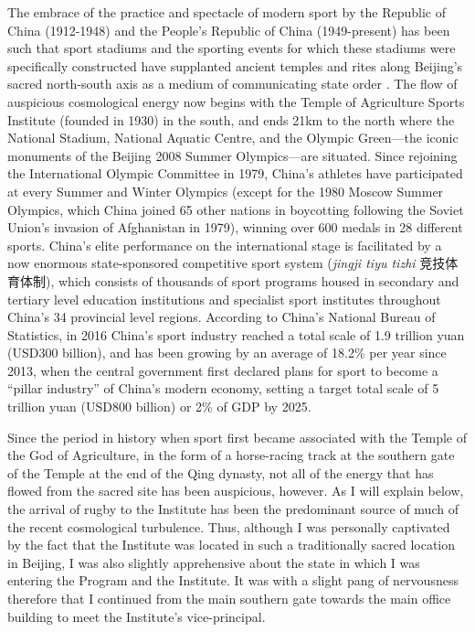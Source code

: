 The embrace of the practice and spectacle of modern sport by the Republic of China (1912-1948) and the People's Republic of China (1949-present) has been such that
sport stadiums and the sporting events for which these stadiums were specifically constructed have supplanted ancient temples and rites along Beijing's sacred north-south axis as a medium of communicating state order \citep{Brownell1995}.  The flow of auspicious cosmological energy now begins with the Temple of Agriculture Sports Institute (founded in 1930) in the south, and ends 21km to the north where the National Stadium, National Aquatic Centre, and the Olympic Green---the iconic monuments of the Beijing 2008 Summer Olympics---are situated.  Since rejoining the International Olympic Committee in 1979, China's athletes have participated at every Summer and Winter Olympics (except for the 1980 Moscow Summer Olympics, which China joined 65 other nations in boycotting following the Soviet Union's invasion of Afghanistan in 1979), winning over 600 medals in 28 different sports.  China's elite performance on the international stage is facilitated by a now enormous state-sponsored competitive sport system (\textit{jingji tiyu tizhi} 竞技体育体制), which consists of thousands of sport programs housed in secondary and tertiary level education institutions and specialist sport institutes throughout China's 34 provincial level regions.  According to China's National Bureau of Statistics, in 2016 China's sport industry reached a total scale of 1.9 trillion yuan (USD300 billion), and has been growing by an average of 18.2\% per year since 2013, when the central government first declared plans for sport to become a ``pillar industry'' of China's modern economy, setting a target total scale of 5 trillion yuan (USD800 billion) or 2\% of GDP by 2025.

Since the period in history when sport first became associated with the Temple of the God of Agriculture, in the form of a horse-racing track at the southern gate of the Temple at the end of the Qing dynasty, not all of the energy that has flowed from the sacred site has been auspicious, however.  As I will explain below, the arrival of rugby to the Institute has been the predominant source of much of the recent cosmological turbulence.  Thus, although I was personally captivated by the fact that the Institute was located in such a traditionally sacred location in Beijing, I was also slightly apprehensive about the state in which I was entering the Program and the Institute. It was with a slight pang of nervousness therefore that I continued from the main southern gate towards the main office building to meet the Institute's vice-principal.


